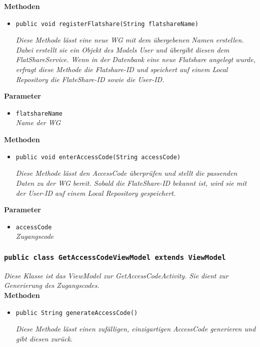 		\textbf{Methoden}
 			\begin{itemize}
        		\item{\texttt{public void registerFlatshare(String flatshareName)}}
        	
        		\textit{Diese Methode lässt eine neue WG mit dem übergebenen Namen erstellen. Dabei erstellt sie ein Objekt des Models User und übergibt diesen dem FlatShareService. Wenn in der Datenbank eine neue Flatshare angelegt wurde, erfragt diese Methode die Flatshare-ID und speichert auf einem Local Repository die FlateShare-ID sowie die User-ID.}
        		
        	\end{itemize}
        
        \textbf{Parameter}
        		\begin{itemize}
        			\item\texttt{flatshareName}\\ 
        			\textit{Name der WG}
        		\end{itemize}
        	
        \textbf{Methoden}
        	\begin{itemize}
        		\item{\texttt{public void enterAccessCode(String accessCode)}}
        	
        		\textit{Diese Methode lässt den AccessCode überprüfen und stellt die passenden Daten zu der WG bereit. Sobald die FlateShare-ID bekannt ist, wird sie mit der User-ID auf einem Local Repository gespeichert.}
        	\end{itemize}
        	
        		\textbf{Parameter}
        		\begin{itemize}
        			\item\texttt{accessCode}\\
        			\textit{Zugangscode}
        		\end{itemize}
   
   
   
             		\subsubsection{\texttt{public class GetAccessCodeViewModel extends ViewModel}}
        \textit{Diese Klasse ist das ViewModel zur GetAccessCodeActivity. Sie dient zur Generierung des Zugangscodes.}\\
        
		\textbf{Methoden}
 			\begin{itemize}
        		\item{\texttt{public String generateAccessCode()}}
        	
        		\textit{Diese Methode lässt einen zufälligen, einzigartigen AccessCode generieren und gibt diesen zurück.}
        	
        	\end{itemize}
        	
